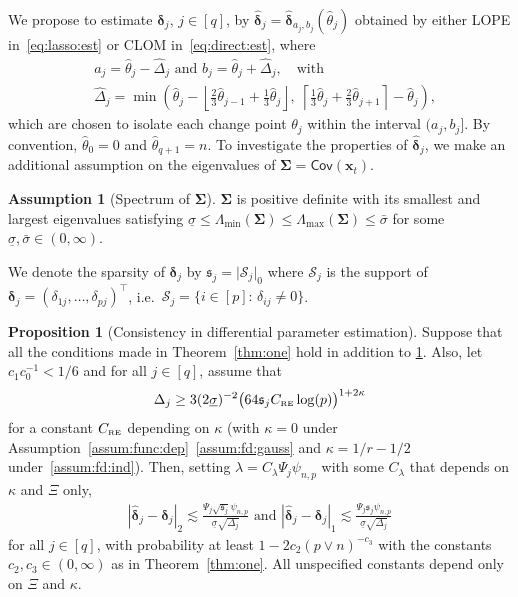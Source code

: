 \documentclass[11pt, a4paper]{article}
\newcommand{\mbf}{\mathbf}
\newcommand{\mc}{\mathcal}
\renewcommand{\l}{\left}
\renewcommand{\r}{\right}
\def\wh{\widehat}
\newcommand{\cp}{\theta}
\newcommand{\Cov}[0]{\mathsf{Cov}}
\newcommand{\nn}{\nonumber}
\newcommand{\crsc}{C_{\text{\tiny \upshape RE}}}
\theoremstyle{definition}
\theoremstyle{definition}
\theoremstyle{definition}
\theoremstyle{definition}
\newtheorem{prop}[thm]{Proposition}
\theoremstyle{definition}
\newtheorem{assum}{Assumption}
\theoremstyle{remark}
\theoremstyle{definition}
\theoremstyle{definition}
\theoremstyle{definition}
\begin{document}
We propose to estimate $\bm\delta_j, \, j \in [q]$, by $\wh{\bm\delta}_j = \wh{\bm\delta}_{a_j, b_j}(\wh\cp_j)$ obtained by either LOPE in~\eqref{eq:lasso:est} or CLOM in~\eqref{eq:direct:est}, where
\begin{align}
\label{eq:ab}
& a_j = \wh\cp_j - \wh{\Delta}_j \text{ \ and \ } b_j = \wh\cp_j + \wh{\Delta}_j, \quad \text{with}
\\
& \wh{\Delta}_j = \min\l(\wh\cp_j - \l\lfloor \frac{2}{3} \wh\cp_{j - 1} + \frac{1}{3} \wh\cp_j \r\rfloor, \;\l\lceil \frac{1}{3} \wh\cp_j + \frac{2}{3} \wh\cp_{j + 1} \r\rceil - \wh\cp_j \r), \nn
\end{align}
which are chosen to isolate each change point $\cp_j$ within the interval $(a_j, b_j]$. By convention, $\wh\cp_0 = 0$ and $\wh\cp_{q+1} = n$.
To investigate the properties of $\wh{\bm\delta}_j$, we make an additional assumption on the eigenvalues of $\bm\Sigma = \Cov(\mbf x_t)$.
\begin{assum}[Spectrum of $\bm\Sigma$]
	\label{assum:xe:iii} 
	$\bm\Sigma$ is positive definite with its smallest and largest eigenvalues satisfying $\underline{\sigma} \le \Lambda_{\min}(\bm\Sigma) \le \Lambda_{\max}(\bm\Sigma) \le \bar{\sigma}$ for some $\underline{\sigma}, \bar{\sigma} \in (0, \infty)$.  
\end{assum}

We denote the sparsity of $\bm\delta_j$ by $\mathfrak{s}_j = \vert \mc S_j \vert_0$ where $\mc S_j$ is the support of $\bm\delta_j = (\delta_{1j}, \ldots, \delta_{pj})^\top$, i.e.\ $\mc S_j = \{i \in [p]: \, \delta_{ij} \ne 0\}$. 

\begin{prop}[Consistency in differential parameter estimation]
	\label{prop:dp:est}
	Suppose that all the conditions made in Theorem~\ref{thm:one} hold in addition to \cref{assum:xe:iii}. Also, let $c_1 c_0^{-1} < 1/6$ and for all $j \in [q]$, assume that
	\begin{align}
	\label{eq:prop:lasso:two}
	\Delta_j \ge 3 (2\underline{\sigma})^{-2} \bigl(64  \mathfrak{s}_j \crsc \log(p) \bigr)^{1 + 2\kappa}
	\end{align}
	for a constant $\crsc$ depending on $\kappa$ (with $\kappa = 0$ under Assumption~\ref{assum:func:dep}~\ref{assum:fd:gauss} and $\kappa = 1/r - 1/2$ under~\ref{assum:fd:ind}).
    Then, setting $\lambda = C_\lambda \Psi_j \psi_{n, p}$ with some $C_\lambda$ that depends on $\kappa$ and $\Xi$ only,
	\begin{align*}
	\l\vert \wh{\bm\delta}_j - \bm\delta_j \r\vert_2 \lesssim \frac{\Psi_j \sqrt{\mathfrak{s}_j} \psi_{n, p}}{\underline{\sigma} \sqrt{\Delta_j}} \text{ \ and \ }
	\l\vert \wh{\bm\delta}_j - \bm\delta_j \r\vert_1 \lesssim \frac{\Psi_j \mathfrak{s}_j \psi_{n, p}}{\underline{\sigma} \sqrt{\Delta_j}}
	\end{align*} 
	for all $j \in [q]$, with probability at least $1 - 2c_2 (p \vee n)^{-c_3}$ with the constants $c_2, c_3 \in (0, \infty)$ as in Theorem~\ref{thm:one}.
	All unspecified constants depend only on $\Xi$ and $\kappa$.
\end{prop}
\end{document}
